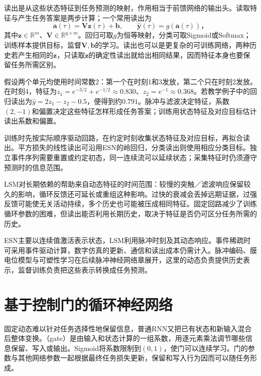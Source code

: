 读出是从这些状态特征到任务预测的映射，作用相当于前馈网络的输出头。读取特征与产生任务答案是两步计算；一个常用读出为
\begin{equation}
  \bm a(\tau)=\bm V\bm z(\tau)+\bm b,
  \qquad\widehat{\bm y}(\tau)=g(\bm a(\tau))\text{，}
  \label{eq:rnn-lsm-readout}
\end{equation}
其中$\bm z\in\mathbb R^m$、$\bm V\in\mathbb R^{q\times m}$。回归可取$g$为恒等映射，分类可取Sigmoid或Softmax；训练样本提供目标，监督$\bm V,\bm b$的学习。读出也可以是更复杂的可训练网络，两种历史若产生相同的$\bm z$，只读取$\bm z$的确定性读出就给出相同结果，因而特征本身也要保留任务所需区别。

\begin{example}[从脉冲活动到预测]
  \label{ex:rnn-lsm-readout}
  假设两个单元均使用时间常数2：第一个在时刻1和3发放，第二个只在时刻2发放。在时刻4，特征为$z_1=e^{-3/2}+e^{-1/2}\approx0.830$、$z_2=e^{-1}\approx0.368$。若教学例子中的回归读出为$\widehat y=2z_1-z_2-0.5$，便得到约$0.791$。脉冲与滤波决定特征，系数$(2,-1)$和偏置决定这些特征怎样形成任务答案；训练用状态特征及对应目标估计读出系数和偏置。
\end{example}

训练时先按实际顺序驱动回路，在约定时刻收集状态特征及对应目标，再拟合读出。平方损失的线性读出可沿用ESN的岭回归，分类读出则使用相应分类目标。独立事件序列需要重置或约定初态，同一连续流可以延续状态；采集特征时仍须遵守预测时的信息范围。

LSM对长期依赖的帮助来自动态特征的时间范围：较慢的突触／滤波响应保留较久的影响，循环反馈还可延长或重组这种影响。过快的衰减会丢掉远期证据，过强反馈可能使无关活动持续，多个历史也可能被压成相同特征。固定回路减少了训练循环参数的困难，但读出能否利用长期历史，取决于特征是否仍可区分任务所需的历史。

ESN主要以连续值激活表示状态，LSM利用脉冲时刻及其动态响应。事件稀疏时可采用事件驱动计算，数字仿真的更新、通信和读出成本仍需计入。脉冲编码、膜电位模型与可塑性学习在后续脉冲神经网络章展开，这里的动态负责提供历史表示，监督训练负责把这些表示转换成任务预测。

\section{基于控制门的循环神经网络}
\label{sec:rnn-gated}

固定动态难以针对任务选择性地保留信息，普通RNN又把已有状态和新输入混合后整体变换。（gate）是由输入和状态计算的一组系数，用逐元素乘法调节哪些信息保留、写入或输出。Sigmoid将系数限制到$(0,1)$，使门可以连续学习。门的参数与其他网络参数一起根据最终任务损失更新，保留和写入行为因而可以随任务形成。

